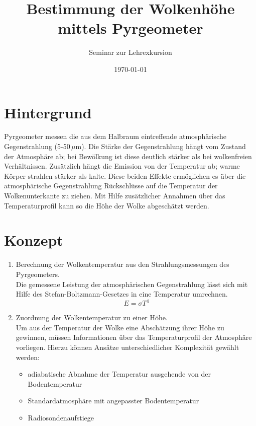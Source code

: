 \documentclass[a4paper,fleqn]{article}
\title{Bestimmung der Wolkenhöhe mittels Pyrgeometer}
\author{Seminar zur Lehrexkursion}
\date{\today}
\numberwithin{equation}{section}
\numberwithin{figure}{section}
\numberwithin{table}{section}
\begin{document}
\maketitle

\section{Hintergrund}\label{sec:hintergrund}
Pyrgeometer messen die aus dem Halbraum eintreffende atmosphärische
Gegenstrahlung (5-50\,$\mu$m).  Die Stärke der Gegenstrahlung hängt vom
Zustand der Atmosphäre ab; bei Bewölkung ist diese deutlich stärker als bei
wolkenfreien Verhältnissen.  Zusätzlich hängt die Emission von der Temperatur
ab; warme Körper strahlen stärker als kalte.  Diese beiden Effekte ermöglichen 
es über die atmosphärische Gegenstrahlung Rückschlüsse auf die Temperatur der
Wolkenunterkante zu ziehen.  Mit Hilfe zusätzlicher Annahmen über das
Temperaturprofil kann so die Höhe der Wolke abgeschätzt werden.

\section{Konzept}\label{sec:konzept}
\begin{enumerate}
  \item Berechnung der Wolkentemperatur aus den Strahlungsmessungen des Pyrgeometers.\\
  Die gemessene Leistung der atmosphärischen Gegenstrahlung lässt sich mit Hilfe des
  Stefan-Boltzmann-Gesetzes in eine Temperatur umrechnen.  
  \[ E = \sigma T^4 \]
  
  \item Zuordnung der Wolkentemperatur zu einer Höhe.\\
  Um aus der Temperatur der Wolke eine Abschätzung ihrer Höhe zu gewinnen,
  müssen Informationen über das Temperaturprofil der Atmosphäre vorliegen.
  Hierzu können Ansätze unterschiedlicher Komplexität gewählt werden:
  \begin{itemize}
    \item adiabatische Abnahme der Temperatur ausgehende von der Bodentemperatur
    \item Standardatmosphäre mit angepasster Bodentemperatur
    \item Radiosondenaufstiege
  \end{itemize}
\end{enumerate}
\end{document}
